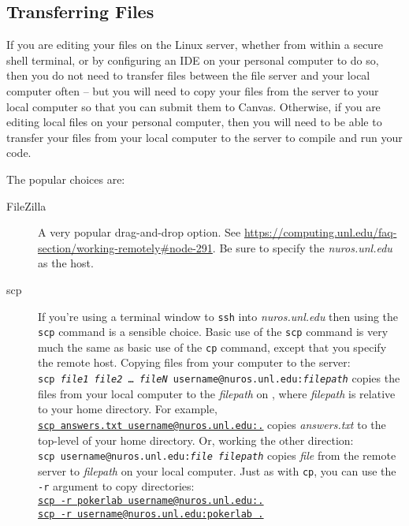 \subsection{Transferring Files}

If you are editing your files on the Linux server, whether from within a secure shell terminal, or by configuring an IDE on your personal computer to do so,
then you do not need to transfer files between the file server and your local computer often -- but you will need to copy your files from the server to your local computer so that you can submit them to Canvas.
Otherwise, if you are editing local files on your personal computer, then you will need to be able to transfer your files from your local computer to the server to compile and run your code.

The popular choices are:
\begin{description}
    \item[FileZilla] A very popular drag-and-drop option.
        See \url{https://computing.unl.edu/faq-section/working-remotely#node-291}.
        Be sure to specify the \textit{nuros.unl.edu} as the host.
    \item[scp] If you're using a terminal window to \texttt{ssh} into \textit{nuros.unl.edu} then using the \texttt{scp} command is a sensible choice.
        Basic use of the \texttt{scp} command is very much the same as basic use of the \texttt{cp} command, except that you specify the remote host.
        Copying files from your computer to the server: \\
        \texttt{scp \textit{file1} \textit{file2} \dots\ \textit{fileN} username@nuros.unl.edu:\textit{filepath}} copies the files from your local computer to the \textit{filepath} on \runtimeenvironment, where \textit{filepath} is relative to your home directory.
        For example, \\
        \underline{\underline{\texttt{scp answers.txt username@nuros.unl.edu:.}}} copies \textit{answers.txt} to the top-level of your home directory.
        Or, working the other direction: \\
        \texttt{scp username@nuros.unl.edu:\textit{file} \textit{filepath}} copies \textit{file} from the remote server to \textit{filepath} on your local computer.
        Just as with \texttt{cp}, you can use the \texttt{-r} argument to copy directories: \\
        \underline{\underline{\texttt{scp -r pokerlab username@nuros.unl.edu:.}}} \\
        \underline{\underline{\texttt{scp -r username@nuros.unl.edu:pokerlab .}}}
\end{description}

